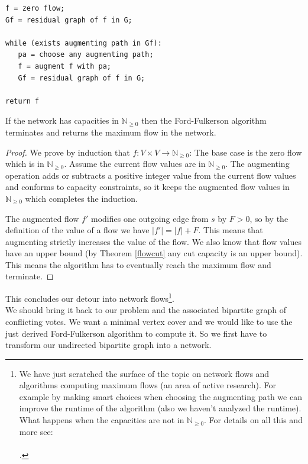 \begin{lstlisting}[basicstyle=\small, label={lst:fordfulkerson}, frame=trBL, caption={Ford-Fulkerson algorithm}]
f = zero flow;
Gf = residual graph of f in G;

while (exists augmenting path in Gf):
   pa = choose any augmenting path; 
   f = augment f with pa;
   Gf = residual graph of f in G;

return f  
\end{lstlisting}

\begin{thm}\label{fordfulkerson}
If the network has capacities in $\mathbb{N}_{\geq 0}$ then the Ford-Fulkerson algorithm terminates and returns the maximum flow in the network.
\end{thm}

\begin{proof}
We prove by induction that $f: V \times V \to \mathbb{N}_{\geq 0}$: The base case is the zero flow which is in $\mathbb{N}_{\geq 0}$. Assume the current flow values are in $\mathbb{N}_{\geq 0}$. The augmenting operation adds or subtracts a positive integer value from the current flow values and conforms to capacity constraints, so it keeps the augmented flow values in $\mathbb{N}_{\geq 0}$ which completes the induction.

The augmented flow $f'$ modifies one outgoing edge from $s$ by $F > 0$, so by the definition of the value of a flow we have $|f'| = |f| + F$. This means that augmenting strictly increases the value of the flow. We also know that flow values have an upper bound (by Theorem \ref{flowcut} any cut capacity is an upper bound). This means the algorithm has to eventually reach the maximum flow and terminate.
\end{proof}

\newpage

This concludes our detour into network flows\footnote{We have just scratched the surface of the topic on network flows and algorithms computing maximum flows (an area of active research). For example by making smart choices when choosing the augmenting path we can improve the runtime of the algorithm (also we haven't analyzed the runtime). What happens when the capacities are not in $\mathbb{N}_{\geq 0}$. For details on all this and more see:
\\
\\ 
.}.
\\
We should bring it back to our problem and the associated bipartite graph of conflicting votes. We want a minimal vertex cover and we would like to use the just derived Ford-Fulkerson algorithm to compute it. So we first have to transform our undirected bipartite graph into a network. 

